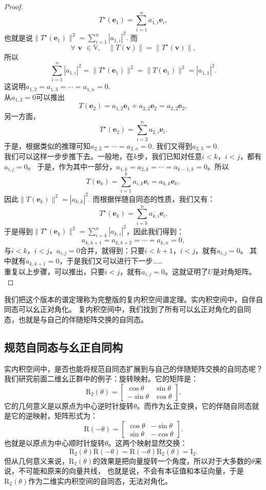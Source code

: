\documentclass[12pt,UTF8]{ctexbook}
\begin{document}
\begin{proof}
    $$ T^\star(\mathbf{e}_1) = \sum_{i=1}^n \overline{a_{1,i}} \mathbf{e}_i,$$
    也就是说$\| T^\star(\mathbf{e}_1)\|^2 = \sum_{i=1}^n |a_{1,i}|^2.$
    而
    $$ \forall \,\, \mathbf{v} \,\, \in\mathbb{V}, \quad \|T(\mathbf{v})\| = \|T^\star(\mathbf{v})\|, $$
    所以
    $$ \sum_{i=1}^n |a_{1,i}|^2 = \| T^\star(\mathbf{e}_1)\|^2 = \| T(\mathbf{e}_1)\|^2 = |a_{1,1}|^2. $$
    这说明$a_{1,2} = a_{1,3} = \cdots = a_{1,n} = 0$.\\
    从$a_{1,2} = 0$可以推出
    $$ T(\mathbf{e}_2) = a_{1,2} \mathbf{e}_1 + a_{2,2} \mathbf{e}_2 = a_{2,2} \mathbf{e}_2,$$
    另一方面，
    $$ T^\star(\mathbf{e}_2) = \sum_{i=2}^n \overline{a_{2,i}} \mathbf{e}_i.$$
    于是，根据类似的推理可知$a_{2,2} = \cdots = a_{2,n} = 0$. 我们又得到$a_{2,3} = 0$. \\
    我们可以这样一步步推下去。一般地，在$k$步，我们已知对任意$i < k$，$i < j$，都有$a_{i,j} = 0$。
    于是，作为其中一部分，$a_{1,k} = a_{2,k} = \cdots = a_{k-1, k} = 0$。所以
    $$ T(\mathbf{e}_{k}) = \sum_{i=1}^k a_{i,k} \mathbf{e}_i = a_{k,k} \mathbf{e}_k,$$
    因此$\| T(\mathbf{e}_{k}) \|^2 = |a_{k,k}|^2$. 而根据伴随自同态的性质，我们又有：
    $$ T^\star(\mathbf{e}_k) = \sum_{i=k}^n \overline{a_{k,i}} \mathbf{e}_i.$$
    于是得到$\| T^\star(\mathbf{e}_{k}) \|^2 = \sum_{i=k}^n |a_{k,i}|^2$，因此我们得到：
    $$ a_{k,k+1} = a_{k,k+2} = \cdots = a_{k,n} = 0,$$
    与$i<k$，$i<j$，$a_{i,j} = 0$合并，就得到：只要$i<k+1$，$i<j$，就有$a_{i,j} = 0$。
    其中就有$a_{k,k+1} = 0$，于是我们又可以进行下一步……\\
    重复以上步骤，可以推出，只要$i<j$，就有$a_{i,j} = 0$。这就证明了$U$是对角矩阵。\\
\end{proof}

我们把这个版本的谱定理称为完整版的复内积空间谱定理。实内积空间中，自伴自同态可以幺正对角化。
复内积空间中，我们找到了所有可以幺正对角化的自同态，也就是与自己的伴随矩阵交换的自同态。

\subsection{规范自同态与幺正自同构}
实内积空间中，是否也能将规范自同态扩展到与自己的伴随矩阵交换的自同态呢？
我们研究前面二维幺正群中的例子：旋转映射。它的矩阵是：
$$\mathrm{R}_2(\theta) = \begin{bmatrix}\cos{\theta} & \sin{\theta} \\ -\sin{\theta} & \cos{\theta}\end{bmatrix}. $$
它的几何意义是以原点为中心逆时针旋转$\theta$。而作为幺正变换，它的伴随自同态就是它的逆映射，矩阵形式为：
$$\mathrm{R}(-\theta) = \begin{bmatrix}\cos{\theta} & -\sin{\theta} \\ \sin{\theta} & -\cos{\theta}\end{bmatrix}. $$
也就是以原点为中心顺时针旋转$\theta$。这两个映射显然交换：
$$\mathrm{R}_2(\theta)\mathrm{R}(-\theta) = \mathrm{R}(-\theta)\mathrm{R}_2(\theta) = \mathrm{I}_2.$$
但从几何意义来说，$\mathrm{R}_2(\theta)$的效果是把向量旋转一个角度，所以对于大多数的$\theta$来说，不可能和原来的向量共线，
也就是说，不会有本征值和本征向量，于是$\mathrm{R}_2(\theta)$作为二维实内积空间的自同态，无法对角化。
\end{document}
